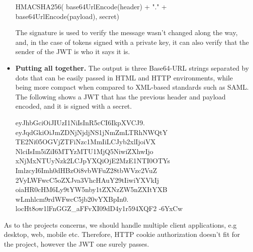 \begin{itemize}
    \begin{spverbatim}
        HMACSHA256(
        base64UrlEncode(header) + "." +
        base64UrlEncode(payload),
        secret)
    \end{spverbatim}

    The signature is used to verify the message wasn't changed along the way, and, in the case of tokens signed
    with a private key, it can also verify that the sender of the JWT is who it says it is.
    \item \textbf{Putting all together.} The output is three Base64-URL strings separated by dots that can be easily
    passed in HTML and HTTP environments, while being more compact when compared to XML-based standards such as SAML\@.
    The following shows a JWT that has the previous header and payload encoded, and it is signed with a secret.

    \begin{spverbatim}
        eyJhbGciOiJIUzI1NiIsInR5cCI6IkpXVCJ9.
        eyJqdGkiOiJmZDNjNjdjNS1jNmZmLTRhNWQtY
        TE2Ni05OGVjZTFiNzc1MmIiLCJyb2xlIjoiVX
        NlciIsIm5iZiI6MTYzMTU1MjQ5NiwiZXhwIjo
        xNjMxNTUyNzk2LCJpYXQiOjE2MzE1NTI0OTYs
        ImlzcyI6Imh0dHBzOi8vbWFuZ28tbWVzc2VuZ
        2VyLWFwcC5oZXJva3VhcHAuY29tIiwiYXVkIj
        oiaHR0cHM6Ly9tYW5nby1tZXNzZW5nZXItYXB
        wLmhlcm9rdWFwcC5jb20vYXBpIn0.
        locHt8ow1lFnGGZ_aFFvXI09dD4y1r594XQF2
        -6YxCw
    \end{spverbatim}

\end{itemize}

As to the projects concerns, we should handle multiple client applications, e.g desktop,
web, mobile etc.
Therefore, HTTP cookie authorization doesn't fit for the project, however the JWT one surely passes.